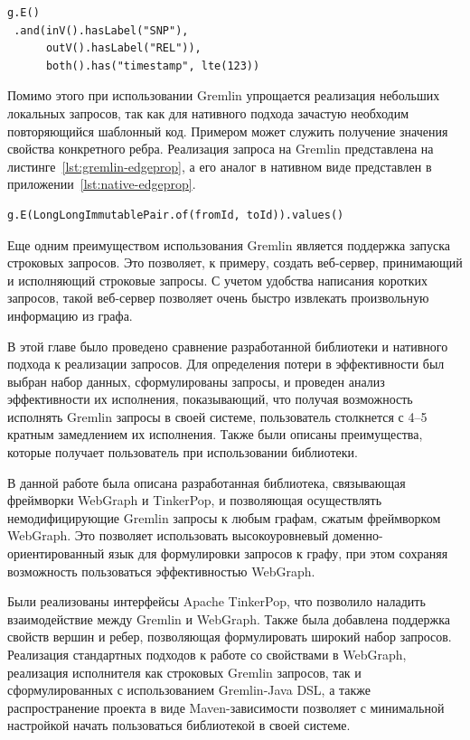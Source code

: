 \documentclass[times,specification,annotation]{itmo-student-thesis}
\begin{document}
\begin{lstlisting}[float=!h,caption={Получение ребер по типам вершин на Gremlin},label={lst:gremlin-edges}]
g.E()
 .and(inV().hasLabel("SNP"),
      outV().hasLabel("REL")),
      both().has("timestamp", lte(123))
\end{lstlisting}

Помимо этого при использовании Gremlin упрощается реализация небольших локальных запросов, так как для нативного подхода зачастую необходим повторяющийся шаблонный код. Примером может служить получение значения свойства конкретного ребра. Реализация запроса на Gremlin представлена на листинге~\ref{lst:gremlin-edgeprop}, а его аналог в нативном виде представлен в приложении~\ref{lst:native-edgeprop}.

\begin{lstlisting}[float=!h,caption={Получение свойства ребра на Gremlin},label={lst:gremlin-edgeprop}]
g.E(LongLongImmutablePair.of(fromId, toId)).values()
\end{lstlisting}

Еще одним преимуществом использования Gremlin является поддержка запуска строковых запросов. Это позволяет, к примеру, создать веб-сервер, принимающий и исполняющий строковые запросы. С учетом удобства написания коротких запросов, такой веб-сервер позволяет очень быстро извлекать произвольную информацию из графа.

\chapterconclusion

В этой главе было проведено сравнение разработанной библиотеки и нативного подхода к реализации запросов. Для определения потери в эффективности был выбран набор данных, сформулированы запросы, и проведен анализ эффективности их исполнения, показывающий, что получая возможность исполнять Gremlin запросы в своей системе, пользователь столкнется с 4--5 кратным замедлением их исполнения. Также были описаны преимущества, которые получает пользователь при использовании библиотеки.

\startconclusionpage

В данной работе была описана разработанная библиотека, связывающая фреймворки WebGraph и TinkerPop, и позволяющая осуществлять немодифицирующие Gremlin запросы к любым графам, сжатым фреймворком WebGraph. Это позволяет использовать высокоуровневый доменно-ориентированный язык для формулировки запросов к графу, при этом сохраняя возможность пользоваться эффективностью WebGraph.

Были реализованы интерфейсы Apache TinkerPop, что позволило наладить взаимодействие между Gremlin и WebGraph. Также была добавлена поддержка свойств вершин и ребер, позволяющая формулировать широкий набор запросов. Реализация стандартных подходов к работе со свойствами в WebGraph, реализация исполнителя как строковых Gremlin запросов, так и сформулированных с использованием Gremlin-Java DSL, а также распространение проекта в виде Maven-зависимости позволяет с минимальной настройкой начать пользоваться библиотекой в своей системе.
\end{document}
